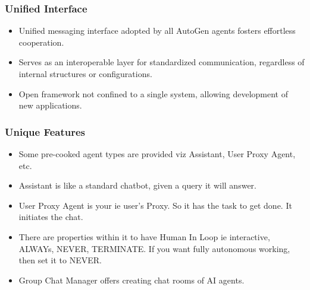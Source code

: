 \begin{frame}[fragile]\frametitle{Unified Interface}
  \begin{itemize}
    \item Unified messaging interface adopted by all AutoGen agents fosters effortless cooperation.
    \item Serves as an interoperable layer for standardized communication, regardless of internal structures or configurations.
    \item Open framework not confined to a single system, allowing development of new applications.
  \end{itemize}
\end{frame}

\begin{frame}[fragile]\frametitle{Unique Features}
  \begin{itemize}
	\item Some pre-cooked agent types are provided viz Assistant, User Proxy Agent, etc.
	\item Assistant is like a standard chatbot, given a query it will answer.
	\item User Proxy Agent is your ie user's Proxy. So it has the task to get done. It initiates the chat.
	\item There are properties within it to have Human In Loop ie interactive, ALWAYs, NEVER, TERMINATE. If you want fully autonomous working, then set it to NEVER.
    \item Group Chat Manager offers creating chat rooms of AI agents.
  \end{itemize}
\end{frame}

